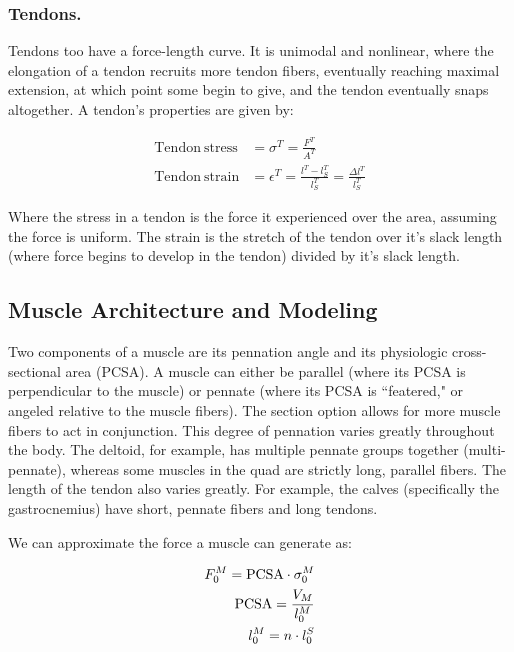 \subsubsection{Tendons.}

Tendons too have a force-length curve. It is unimodal and nonlinear, where the elongation of a tendon recruits more tendon fibers, eventually reaching maximal extension, at which point some begin to give, and the tendon eventually snaps altogether. A tendon's properties are given by: 

\begin{equation}
\begin{split}
    \mathrm{Tendon\: stress} &= \sigma^T = \frac{F^T}{A^T}\\
     \mathrm{Tendon\: strain} &= \epsilon^T = \frac{l^T - l^T_S}{l^T_S} = \frac{\Delta l^T}{l^T_S}
\end{split}
\end{equation}

Where the stress in a tendon is the force it experienced over the area, assuming the force is uniform. The strain is the stretch of the tendon over it's slack length (where force begins to develop in the tendon) divided by it's slack length. 

\subsection{Muscle Architecture and Modeling}

Two components of a muscle are its pennation angle and its physiologic cross-sectional area (PCSA). A muscle can either be parallel (where its PCSA is perpendicular to the muscle) or pennate (where its PCSA is ``featered," or angeled relative to the muscle fibers). The section option allows for more muscle fibers to act in conjunction. This degree of pennation varies greatly throughout the body. The deltoid, for example, has multiple pennate groups together (multi-pennate), whereas some muscles in the quad are strictly long, parallel fibers. The length of the tendon also varies greatly. For example, the calves (specifically the gastrocnemius) have short, pennate fibers and long tendons.\newline

We can approximate the force a muscle can generate as: 

\begin{equation}
\begin{split}
    F_0^M = {\rm PCSA}\cdot \sigma_0^M \\
    {\rm PCSA} = \frac{V_M}{l_0^M} \\
    l_0^M = n\cdot l^S_0
\end{split}
\end{equation}

